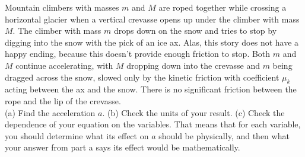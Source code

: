 Mountain climbers with masses $m$ and $M$ are roped together while crossing
a horizontal glacier when a vertical crevasse opens up under the climber with mass $M$.
The climber with mass $m$ drops down on the snow and tries to stop by digging
into the snow with the pick of an ice ax. Alas, this story does not have a
happy ending, because this doesn't provide enough friction to stop. Both $m$ and $M$
continue accelerating, with $M$ dropping down into the crevasse and $m$ being dragged
across the snow, slowed only by the kinetic friction with coefficient $\mu_k$ acting
between the ax and the snow. There is no significant friction between the rope and the
lip of the crevasse.\\
(a) Find the acceleration $a$.\answercheck\hwendpart
(b) Check the units of your result.\hwendpart
(c) Check the dependence of your equation on the variables. That means that for each
variable, you should determine what its effect on $a$ should be physically, and then
what your answer from part a says its effect would be mathematically.
